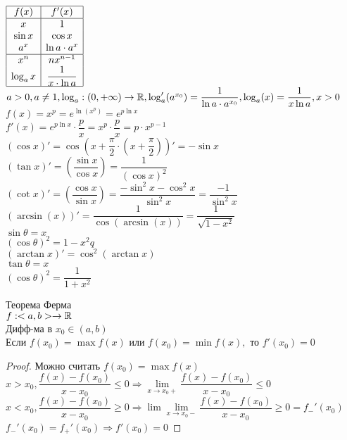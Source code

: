 $\begin{array}{|c|c|}
\hline
f(x)	& f'(x)  \\ 
\hline
x	& 1 \\ 
\sin x	& \cos x \\ 
a^x	& \ln a \cdot a^x \\ 
	\hline 
x^n	& nx^{n-1}  \\ 
\log_a x & \dfrac{1}{x \cdot \ln a}  \\
\hline
\end{array} $ $ a > 0, a \neq 1, \log_a : (0, +\infty) \rightarrow \mathbb{R}, \log_a' (a^{x_0}) = \dfrac{1}{\ln a \cdot a^{x_0}}, \log_a (x) = \dfrac{1}{x \ln a}, x > 0$ \\
$ f(x) = x^p = e^{\ln(x^p)} = e^{p \ln x} $\\
$ f'(x) = e^{p \ln x} \cdot \dfrac{p}{x} = x^p \cdot \dfrac{p}{x} = p \cdot x^{p-1} $\\
$ (\cos x)' = \cos (x + \dfrac{\pi}{2} \cdot (x + \dfrac{\pi}{2}))' = -\sin x $ \\
$ (\tan x)' = (\dfrac{\sin x}{\cos x}) = \dfrac{1}{(\cos x)^2} $ \\
$ (\cot x)' = (\dfrac{\cos x}{\sin x}) = \dfrac{-\sin^2 x - \cos^2 x}{\sin^2 x} = \dfrac{-1}{\sin^2 x}  $\\
$ (\arcsin(x))' = \dfrac{1}{\cos(\arcsin(x))} = \dfrac{1}{\sqrt{1 - x^2}} $ \\
$ \sin \theta = x $ \\
$ (\cos \theta )^2 = 1 - x^2 q	$\\
$ (\arctan x)' = \cos^2 (\arctan x) $ \\
$ \tan \theta = x $ \\
$ (\cos \theta)^2 = \dfrac{1}{1 + x^2} $ \\

\begin{theorem}
	Теорема Ферма \\
	$ f : <a, b> \rightarrow \mathbb{R} $ \\
	Дифф-ма в $ x_0 \in (a, b) $ \\
	Если $ f(x_0) = \max f(x) $ или $ f(x_0) = \min f(x), $ то $ f'(x_0) = 0 $ \\
	\begin{proof}
		Можно считать $ f(x_0) = \max f(x) $ \\
		$ x > x_0, \dfrac{f(x) - f(x_0)}{x- x_0} \leq 0 \Rightarrow \lim\limits_{x \rightarrow x_0+} \dfrac{f(x) - f(x_0)}{x- x_0} \leq 0 $ \\
		$ x < x_0, \dfrac{f(x) - f(x_0)}{x- x_0} \geq 0 \Rightarrow \lim\lim\limits_{x \rightarrow x_0 -} \dfrac{f(x) - f(x_0)}{x- x_0} \geq 0 = f_-'(x_0) $ \\
		$ f_-'(x_0) = f_+'(x_0) \Rightarrow f'(x_0) = 0 $
	\end{proof}
\end{theorem}


